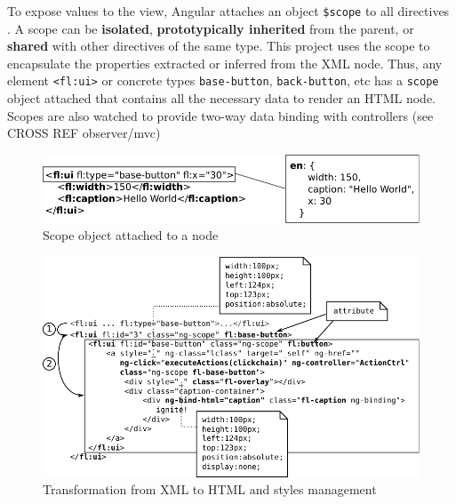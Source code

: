 To expose values to the view, Angular attaches an object \texttt{\$scope} to all directives  .
A scope can be \textbf{isolated}, \textbf{prototypically inherited} from the parent, or \textbf{shared} with other directives of the same type.
This project uses the scope to encapsulate the properties extracted or inferred from the \ac{XML} node.
Thus, any element \lstinline$<fl:ui>$ or concrete types \lstinline$base-button$, \lstinline$back-button$, etc has a \texttt{scope} object attached that contains all the necessary data to render an \ac{HTML} node.
Scopes are also watched to provide two-way data binding with controllers (see CROSS REF observer/mvc)

\begin{figure}[h]
    \centering
    \includegraphics{figures/design/properties-management.pdf}
    \caption{Scope object attached to a node}
    \label{fig:design-properties-management}
\end{figure}




\begin{figure}
    \centering
    \includegraphics{figures/design/from-xml-to-html-3.pdf}
    \caption{Transformation from XML to HTML and styles management}
    \label{fig:design-xml-to-html-3}
\end{figure}


